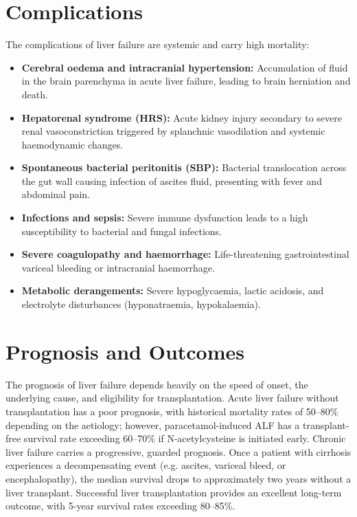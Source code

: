 \section*{Complications}
The complications of liver failure are systemic and carry high mortality:
\begin{itemize}
    \item \textbf{Cerebral oedema and intracranial hypertension:} Accumulation of fluid in the brain parenchyma in acute liver failure, leading to brain herniation and death.
    \item \textbf{Hepatorenal syndrome (HRS):} Acute kidney injury secondary to severe renal vasoconstriction triggered by splanchnic vasodilation and systemic haemodynamic changes.
    \item \textbf{Spontaneous bacterial peritonitis (SBP):} Bacterial translocation across the gut wall causing infection of ascites fluid, presenting with fever and abdominal pain.
    \item \textbf{Infections and sepsis:} Severe immune dysfunction leads to a high susceptibility to bacterial and fungal infections.
    \item \textbf{Severe coagulopathy and haemorrhage:} Life-threatening gastrointestinal variceal bleeding or intracranial haemorrhage.
    \item \textbf{Metabolic derangements:} Severe hypoglycaemia, lactic acidosis, and electrolyte disturbances (hyponatraemia, hypokalaemia).
\end{itemize}

\section*{Prognosis and Outcomes}
The prognosis of liver failure depends heavily on the speed of onset, the underlying cause, and eligibility for transplantation. Acute liver failure without transplantation has a poor prognosis, with historical mortality rates of 50--80\% depending on the aetiology; however, paracetamol-induced ALF has a transplant-free survival rate exceeding 60--70\% if N-acetylcysteine is initiated early. Chronic liver failure carries a progressive, guarded prognosis. Once a patient with cirrhosis experiences a decompensating event (e.g. ascites, variceal bleed, or encephalopathy), the median survival drops to approximately two years without a liver transplant. Successful liver transplantation provides an excellent long-term outcome, with 5-year survival rates exceeding 80--85\%.

